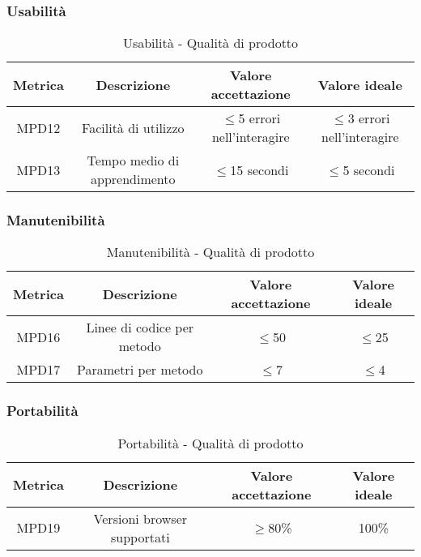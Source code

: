 \documentclass[10pt]{article}
\begin{document}
\begin{justify}
\subsubsection{Usabilità}
\begin{table}[H]
  \centering
\begin{tabular}{|c|c|c|c|}
  \hline
  \textbf{Metrica} & \textbf{Descrizione} & \textbf{Valore accettazione} & \textbf{Valore ideale}\\
  \hline
  MPD12 & Facilità di utilizzo & $\leq$5 errori nell'interagire & $\leq$3 errori nell'interagire  \\
  \hline
  MPD13 & Tempo medio di apprendimento & $\leq$15 secondi & $\leq$5 secondi \\
  \hline
\end{tabular}
\caption{Usabilità - Qualità di prodotto}
\label{tab:usabilità}
\end{table}

\subsubsection{Manutenibilità}
\begin{table}[H]
  \centering
\begin{tabular}{|c|c|c|c|}
  \hline
  \textbf{Metrica} & \textbf{Descrizione} & \textbf{Valore accettazione} & \textbf{Valore ideale}\\
  \hline
  MPD16 & Linee di codice per metodo & $\leq$50 & $\leq$25 \\
  \hline
  MPD17 & Parametri per metodo & $\leq$7 & $\leq$4 \\
  \hline
\end{tabular}
\caption{Manutenibilità - Qualità di prodotto}
\label{tab:manutenibilità}
\end{table}

\subsubsection{Portabilità}
\begin{table}[H]
  \centering
\begin{tabular}{|c|c|c|c|}
  \hline
  \textbf{Metrica} & \textbf{Descrizione} & \textbf{Valore accettazione} & \textbf{Valore ideale}\\
  \hline
  MPD19 & Versioni browser supportati & $\geq$80\% & 100\% \\
  \hline
\end{tabular}
\caption{Portabilità - Qualità di prodotto}
\label{tab:portabilità}
\end{table}



\end{justify}
\end{document}
